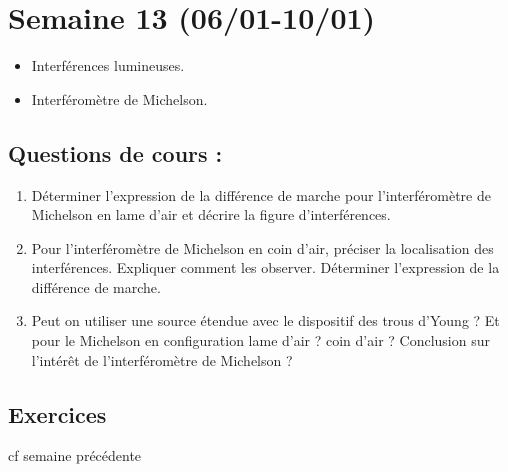 \section{Semaine 13 (06/01-10/01)}


\begin{itemize}
	\item Interférences lumineuses.
	\item Interféromètre de Michelson.
\end{itemize}

\subsection{Questions de cours :}
\begin{enumerate}
	\item Déterminer l'expression de la différence de marche pour l'interféromètre de Michelson en lame d'air et décrire la figure d'interférences.
	\item Pour l'interféromètre de Michelson en coin d'air, préciser la localisation des interférences. Expliquer comment les observer. Déterminer l'expression de la différence de marche.
	\item Peut on utiliser une source étendue avec le dispositif des trous d'Young ? Et pour le Michelson en configuration lame d'air ? coin d'air ? Conclusion sur l'intérêt de l'interféromètre de Michelson ?
\end{enumerate}

\subsection{Exercices}
cf semaine précédente